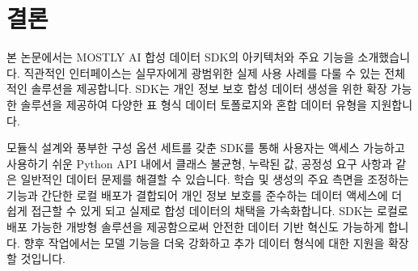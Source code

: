 
\section{결론}
\label{sec:conclusion}
본 논문에서는 MOSTLY AI 합성 데이터 SDK의 아키텍처와 주요 기능을 소개했습니다.
직관적인 인터페이스는 실무자에게 광범위한 실제 사용 사례를 다룰 수 있는 전체적인 솔루션을 제공합니다.
SDK는 개인 정보 보호 합성 데이터 생성을 위한 확장 가능한 솔루션을 제공하여 다양한 표 형식 데이터 토폴로지와 혼합 데이터 유형을 지원합니다.

모듈식 설계와 풍부한 구성 옵션 세트를 갖춘 SDK를 통해 사용자는 액세스 가능하고 사용하기 쉬운 Python API 내에서 클래스 불균형, 누락된 값, 공정성 요구 사항과 같은 일반적인 데이터 문제를 해결할 수 있습니다. 학습 및 생성의 주요 측면을 조정하는 기능과 간단한 로컬 배포가 결합되어 개인 정보 보호를 준수하는 데이터 액세스에 더 쉽게 접근할 수 있게 되고 실제로 합성 데이터의 채택을 가속화합니다. SDK는 로컬로 배포 가능한 개방형 솔루션을 제공함으로써 안전한 데이터 기반 혁신도 가능하게 합니다. 향후 작업에서는 모델 기능을 더욱 강화하고 추가 데이터 형식에 대한 지원을 확장할 것입니다.
